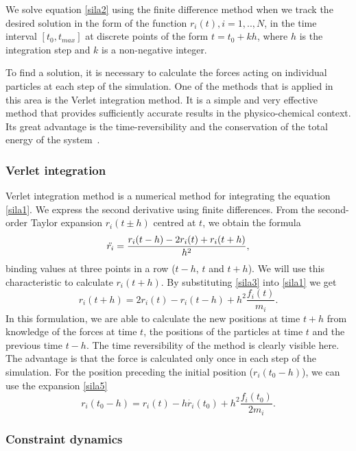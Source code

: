 We solve equation \ref{sila2} using the finite difference method when we track the desired solution in the form of the function $r_i(t), i=1,..,N$, in the time interval $[t_0,t_{max}]$ at discrete points of the form $t=t_0+kh$, where $h$ is the integration step and $k$ is a non-negative integer.

To find a solution, it is necessary to calculate the forces acting on individual particles at each step of the simulation. One of the methods that is applied in this area is the Verlet integration method. It is a simple and very effective method that provides sufficiently accurate results in the physico-chemical context. Its great advantage is the time-reversibility and the conservation of the total energy of the system~\cite{mdskripta}.

\subsubsection{Verlet integration}
Verlet integration method is a numerical method for integrating the equation \ref{sila1}. We express the second derivative using finite differences. From the second-order Taylor expansion $r_i(t\pm h)$ centred at $t$, we obtain the formula
\begin{equation}\label{sila3}
	\Ddot{r_i}=\frac{r_i(t-h)-2r_i(t)+r_i(t+h)}{h^2},
\end{equation}
binding values at three points in a row ($t-h$, $t$ and $t+h$). We will use this characteristic to calculate $r_i(t+h)$. By substituting \ref{sila3} into \ref{sila1} we get 
\begin{equation}\label{sila4}
	r_i(t+h)=2r_i(t)-r_i(t-h)+h^2\frac{f_i(t)}{m_i}.
\end{equation}
In this formulation, we are able to calculate the new positions at time $t+h$ from knowledge of the forces at time $t$, the positions of the particles at time $t$ and the previous time $t-h$. The time reversibility of the method is clearly visible here. The advantage is that the force is calculated only once in each step of the simulation. For the position preceding the initial position ($r_i(t_0-h)$), we can use the expansion \ref{sila5}
\begin{equation}\label{sila5}
	r_i(t_0-h)=r_i(t)-h\dot{r_i}(t_0)+h^2\frac{f_i(t_0)}{2m_i}.
\end{equation}

\subsubsection{Constraint dynamics}

